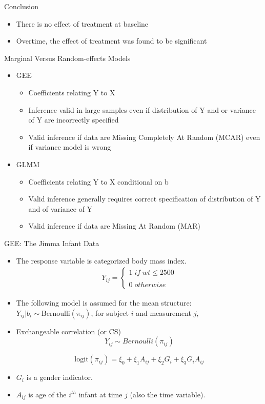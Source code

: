 \documentclass{beamer}
\begin{document}
\begin{frame}{Conclusion}
\begin{itemize}
	\item There is no effect of treatment at baseline \vspace{0.5cm}
	\item Overtime, the effect of treatment was found to be significant
\end{itemize}
\end{frame}

\begin{frame}{Marginal Versus Random-effects Models}
\begin{itemize}
	\item GEE
	\begin{itemize}
		\item Coefficients relating Y to X
		\item Inference valid in large samples even if distribution of Y and or variance of Y are incorrectly specified
		\item Valid inference if data are Missing Completely At Random (MCAR) even if variance model is wrong
	\end{itemize}
\item GLMM
\begin{itemize}
	\item Coefficients relating Y to X conditional on b
	\item Valid inference generally requires correct specification of distribution of Y and of variance of Y
	\item Valid inference if data are Missing At Random (MAR)
\end{itemize}
\end{itemize}
\end{frame}

\begin{frame}{GEE: The Jimma Infant Data}
\begin{itemize}\itemsep=0.2cm
\item The response variable is categorized body mass index.
	\begin{eqnarray*}
	Y_{ij}=\left\{\begin{array}{l}
		1 \; if \; wt\le 2500\\\\
		0 \; otherwise
	\end{array}\right.
	\end{eqnarray*}
\item The following model is assumed for the mean structure: $Y_{ij} | b_i  \sim  \mbox{Bernoulli}(\pi_{ij})$, for subject $i$ and measurement $j$,
\item Exchangeable correlation (or CS)
\[Y_{ij}\sim Bernoulli(\pi_{ij}) \]

\[\mbox{logit}(\pi_{ij})  =  \xi_0  +  \xi_1 A_{ij} + \xi_2 G_i + \xi_3 G_i A_{ij}
\]
\item $G_{i}$ is a gender indicator.
\item $A_{ij}$ is age of the $i^{th}$  infant at time $j$ (also the time variable).
\end{itemize}
\end{frame}
\end{document}
